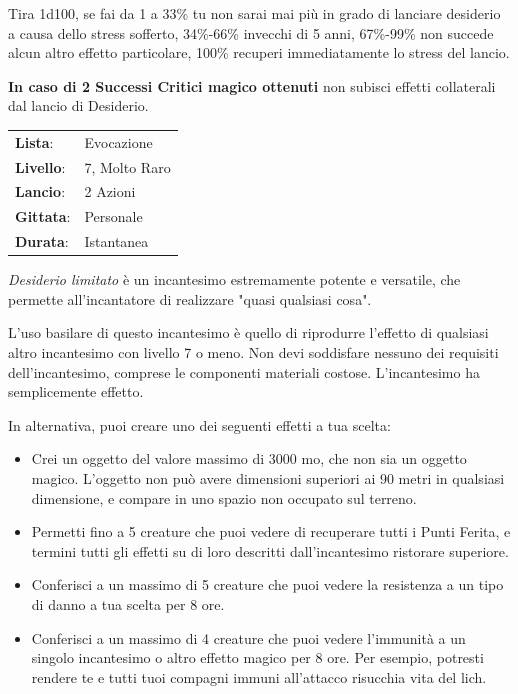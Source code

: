 \begin{multicols}{2}
Tira 1d100, se fai da 1 a 33\% tu non sarai mai più in grado di lanciare desiderio a causa dello stress sofferto, 34\%-66\% invecchi di 5 anni, 67\%-99\% non succede alcun altro effetto particolare, 100\% recuperi immediatamente lo stress del lancio.

\textbf{In caso di 2 Successi Critici magico ottenuti} non subisci effetti collaterali dal lancio di Desiderio.


\noindent\begin{tabularx}{\linewidth}{p{1.3cm}X}
	\rowcolor{gray!20}\textbf{Lista}: & Evocazione \\
	\textbf{Livello}: & 7, Molto Raro \\
	\rowcolor{gray!20}\textbf{Lancio}: & 2 Azioni \\
	\textbf{Gittata}: & Personale \\
	\rowcolor{gray!20}\textbf{Durata}: & Istantanea \\
\end{tabularx}\smallskip

\emph{Desiderio limitato} è un incantesimo estremamente potente e versatile, che permette all'incantatore di realizzare "quasi qualsiasi cosa".

L'uso basilare di questo incantesimo è quello di riprodurre l'effetto di qualsiasi altro incantesimo con livello 7 o meno. Non devi soddisfare nessuno dei requisiti dell'incantesimo, comprese le componenti materiali costose. L'incantesimo ha semplicemente effetto.

In alternativa, puoi creare uno dei seguenti effetti a tua scelta:

\begin{itemize}[leftmargin=*] \setlength{\itemsep}{0pt}
	\item Crei un oggetto del valore massimo di 3000 mo, che non sia un oggetto magico. L'oggetto non può avere dimensioni superiori ai 90 metri in qualsiasi dimensione, e compare in uno spazio non occupato sul terreno.
	\item Permetti fino a 5 creature che puoi vedere di recuperare tutti i Punti Ferita, e termini tutti gli effetti su di loro descritti dall'incantesimo ristorare superiore.
	\item Conferisci a un massimo di 5 creature che puoi vedere la resistenza a un tipo di danno a tua scelta per 8 ore.
	\item Conferisci a un massimo di 4 creature che puoi vedere l'immunità a un singolo incantesimo o altro effetto magico per 8 ore. Per esempio, potresti rendere te e tutti tuoi compagni immuni all'attacco risucchia vita del lich.
\end{itemize}


\end{multicols}
